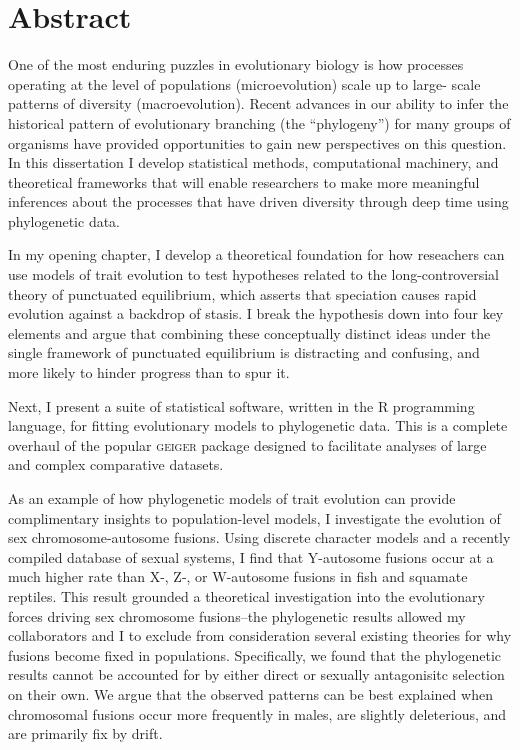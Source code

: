 \chapter*{Abstract}

One of the most enduring puzzles in evolutionary biology is how processes operating at the level of populations (microevolution) scale up to large-
scale patterns of diversity (macroevolution). Recent advances in our ability to infer the historical pattern of evolutionary branching (the ``phylogeny'') for many groups of organisms have provided opportunities to gain new perspectives on this question. In this dissertation I develop statistical methods, computational machinery, and theoretical frameworks that will enable researchers to make more meaningful inferences about the processes that have driven diversity through deep time using phylogenetic data.

In my opening chapter, I develop a theoretical foundation for how reseachers can use models of trait evolution to test hypotheses related to the long-controversial theory of punctuated equilibrium, which asserts that speciation causes rapid evolution against a backdrop of stasis. I break the hypothesis down into four key elements and argue that combining these conceptually distinct ideas under the single framework of punctuated equilibrium is distracting and confusing, and more likely to hinder progress than to spur it. 

Next, I present a suite of statistical software, written in the R programming language, for fitting evolutionary models to phylogenetic data. This is a complete overhaul of the popular \textsc{geiger} package designed to facilitate analyses of large and complex comparative datasets.

As an example of how phylogenetic models of trait evolution can provide complimentary insights to population-level models, I investigate the evolution of sex chromosome-autosome fusions. Using discrete character models and a recently compiled database of sexual systems, I find that Y-autosome fusions occur at a much higher rate than X-, Z-, or W-autosome fusions in fish and squamate reptiles. This result grounded a theoretical investigation into the evolutionary forces driving sex chromosome fusions--the phylogenetic results allowed my collaborators and I to exclude from consideration several existing theories for why fusions become fixed in populations. Specifically, we found that the phylogenetic results cannot be accounted for by either direct or sexually antagonisitc selection on their own. We argue that the observed patterns can be best explained when chromosomal fusions occur more frequently in males, are slightly deleterious, and are primarily fix by drift.

